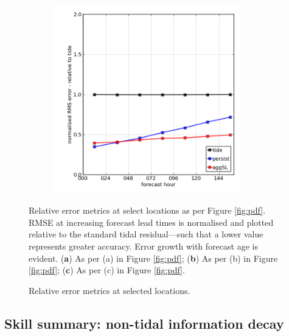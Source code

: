 \begin{figure}[H]
\begin{subfigure}{0.30\textwidth}
    \caption{}
    \end{subfigure}
    \begin{subfigure}{0.30\textwidth}
    \includegraphics[width=0.9\textwidth]{figures/plots/0003_rms_growth.png}
    \caption{}
    \end{subfigure}
    
    \caption{Relative error metrics at selected locations.}
    {Relative error metrics at select locations as per Figure \ref{fig:pdf}. RMSE at increasing forecast lead times is normalised and plotted relative to the standard tidal residual---such that a lower value represents greater accuracy. Error growth with forecast age is evident. (\textbf{a}) As per (a) in Figure \ref{fig:pdf}; (\textbf{b}) As per (b) in Figure \ref{fig:pdf}; (\textbf{c}) As per (c) in Figure \ref{fig:pdf}.}
    \label{fig:rms}
\end{figure}   

\subsection{Skill summary: non-tidal information decay}
\label{sec:skill}

